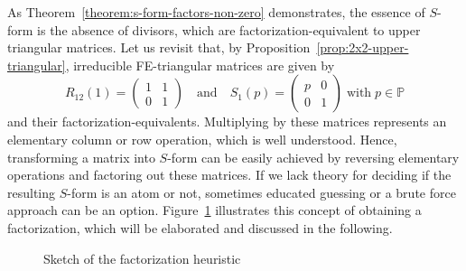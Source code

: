 As Theorem~\ref{theorem:s-form-factors-non-zero} demonstrates, the essence of $S$-form is the absence of divisors, which are factorization-equivalent to upper triangular matrices. Let us revisit that, by Proposition~\ref{prop:2x2-upper-triangular}, irreducible FE-triangular matrices are given by 
\[ R_{12}(1) = \begin{pmatrix} 1 & 1\\ 0 & 1 \end{pmatrix} \quad \text{and} \quad S_{1}(p) = \begin{pmatrix} p & 0\\ 0 & 1 \end{pmatrix} \; \text{with} \; p \in \mathbb{P} \]
and their factorization-equivalents. Multiplying by these matrices represents an elementary column or row operation, which is well understood. Hence, transforming a matrix into $S$-form can be easily achieved by reversing elementary operations and factoring out these matrices. If we lack theory for deciding if the resulting $S$-form is an atom or not, sometimes educated guessing or a brute force approach can be an option. Figure~\ref{fig:sketch-heuristic} illustrates this concept of obtaining a factorization, which will be elaborated and discussed in the following.

\begin{figure}[H]
\begin{center}
 \caption{Sketch of the factorization heuristic}\label{fig:sketch-heuristic}
\end{center}
\end{figure}

